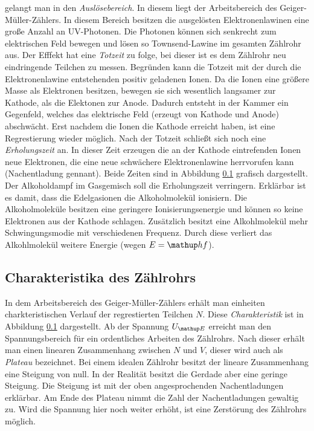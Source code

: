 gelangt man in den \emph{Auslösebereich}. In diesem liegt der Arbeitsbereich des
Geiger-Müller-Zählers. In diesem Bereich besitzen die ausgelösten Elektronenlawinen
eine große Anzahl an UV-Photonen. Die Photonen können sich senkrecht zum elektrischen Feld bewegen
und lösen so Townsend-Lawine im gesamten Zählrohr aus. Der Efffekt hat eine
\emph{Totzeit} zu folge, bei dieser ist es dem Zählrohr neu eindringende Teilchen
zu messen. Begründen kann die Totzeit mit der durch die Elektronenlawine entstehenden
positiv geladenen Ionen. Da die Ionen eine größere Masse als Elektronen besitzen,
bewegen sie sich wesentlich langsamer zur Kathode, als die Elektonen
zur Anode. Dadurch entsteht in der Kammer ein Gegenfeld, welches das
elektrische Feld (erzeugt von Kathode und Anode) abschwächt.
Erst nachdem die Ionen die Kathode erreicht haben, ist eine
Regrestierung wieder möglich. Nach der Totzeit schließt sich
noch eine \emph{Erholungszeit} an. In dieser Zeit erzeugen
die an der Kathode eintrefenden Ionen neue Elektronen, die eine neue
schwächere Elektronenlawine herrvorufen kann (Nachentladung gennant). Beide Zeiten sind
in Abbildung \ref{} grafisch dargestellt. Der Alkoholdampf im Gasgemisch
soll die Erholungszeit verringern. Erklärbar ist es damit, dass
die Edelgasionen die Alkoholmolekül ionisiern. Die Alkoholmoleküle
besitzen eine geringere Ionisierungsenergie und können so keine Elektronen aus
der Kathode schlagen. Zusätzlich besitzt eine Alkohlmolekül mehr Schwingungsmodie
mit verschiedenen Frequenz. Durch diese verliert das Alkohlmolekül
weitere Energie (wegen $E=\map{h}f$).

\subsection{Charakteristika des Zählrohrs}
In dem Arbeitsbereich des Geiger-Müller-Zählers erhält man einheiten
charkteristischen Verlauf der regrestierten Teilchen $N$.
Diese \emph{Charakteristik} ist in Abbildung \ref{} dargestellt.
Ab der Spannung $U\ua{E}$ erreicht man den Spannungsbereich für ein
ordentliches Arbeiten des Zählrohrs. Nach dieser erhält man einen
linearen Zusammenhang zwischen $N$ und $V$, dieser wird auch als
\emph{Plateau} bezeichnet. Bei einem idealen Zählrohr besitzt der
lineare Zusammenhang eine Steigung von null. In der Realität besitzt
die Gerdade aber eine geringe Steigung. Die Steigung ist mit der oben
angesprochenden Nachentladungen erklärbar. Am Ende des Plateau nimmt die
Zahl der Nachentladungen gewaltig zu. Wird die Spannung hier noch weiter erhöht,
ist eine Zerstörung des Zählrohrs möglich.
